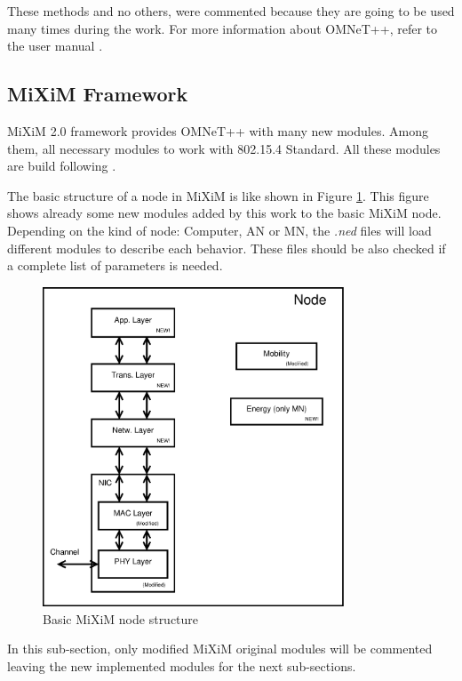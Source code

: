 These methods and no others, were commented because they are going to be used many times during the work. For more information about \ac{OMNeT++}, 
refer to the user manual \cite{manualomnet}.

\subsection{\ac{MiXiM} Framework}

\ac{MiXiM} 2.0 framework provides \ac{OMNeT++} with many new modules. Among them, all necessary modules to work with 802.15.4 Standard. 
All these modules are build following \cite{IEEE802.15.4-2006}.

The basic structure of a node in \ac{MiXiM} is like shown in Figure \ref{fig:miximmodule}. This figure shows already some new modules added by
this work to the basic \ac{MiXiM} node. Depending on the kind of node: Computer, \ac{AN} or \ac{MN}, the \textit{.ned} files will load 
different modules to describe each behavior. These files should be also checked if a complete list of parameters is needed.

\begin{figure}[ht]
 \begin{center}
  \includegraphics[width=0.8\textwidth]{miximmodule.eps}
 \end{center}
 \caption{Basic \ac{MiXiM} node structure}
 \label{fig:miximmodule}
\end{figure}

In this sub-section, only modified \ac{MiXiM} original modules will be commented leaving the new implemented modules for the next sub-sections.

